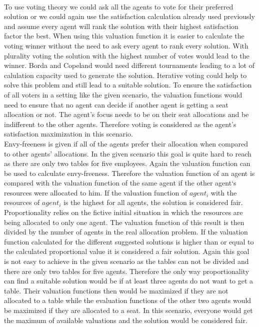 \documentclass[german, a4paper, 11pt, oneside]{scrbook}
\begin{document}
\\To use voting theory we could ask all the agents to vote for their preferred solution or we could again use the satisfaction calculation already used previously and assume every agent will rank the solution with their highest satisfaction factor the best. When using this valuation function it is easier to calculate the voting winner without the need to ask every agent to rank every solution. With plurality voting the solution with the highest number of votes would lead to the winner. Borda and Copeland would need different tournaments leading to a lot of calulation capacity used to generate the solution. Iterative voting could help to solve this problem and still lead to a suitable solution. To ensure the satisfaction of all voters in a setting like the given scenario, the valuation functions would need to ensure that no agent can decide if another agent is getting a seat allocation or not. The agent's focus needs to be on their seat allocations and be indifferent to the other agents. Therefore voting is considered as the agent's satisfaction maximization in this scenario.
\\Envy-freeness is given if all of the agents prefer their allocation when compared to other agents' allocations. In the given scenario this goal is quite hard to reach as there are only two tables for five employees. Again the valuation function can be used to calculate envy-freeness. Therefore the valuation function of an agent is compared with the valuation function of the same agent if the other agent`s resources were allocated to him. If the valuation function of $agent_i$ with the resources of $agent_i$ is the highest for all agents, the solution is considered fair.
\\Proportionality relies on the fictive initial situation  in which the resources are being allocated to only one agent. The valuation function of this result is then divided by the number of agents in the real allocation problem. If the valuation function calculated for the different suggested solutions is higher than or equal to the calculated proportional value it is considered a fair solution. Again this goal is not easy to achieve in the given scenario as the tables can not be divided and there are only two tables for five agents. Therefore the only way proportionality can find a suitable solution would be if at least three agents do not want to get a table. Their valuation functions then would be maximized if they are not allocated to a table while the evaluation functions of the other two agents would be maximized if they are allocated to a seat. In this scenario, everyone would get the maximum of available valuations and the solution would be considered fair.
\end{document}
